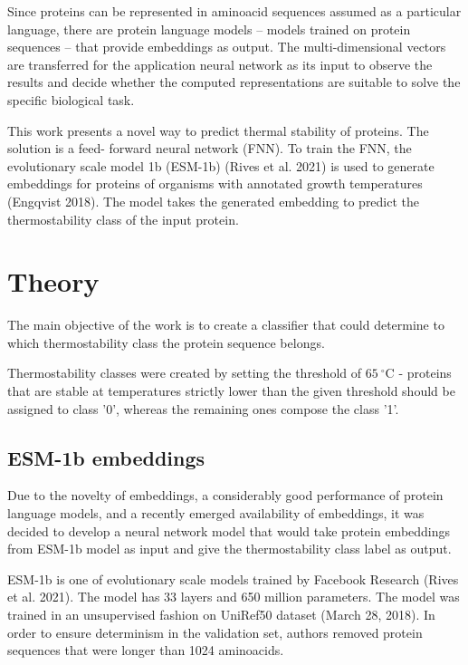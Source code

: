 \documentclass[12pt]{report}
\begin{document}
	Since proteins can be represented in aminoacid sequences assumed as a 
	particular language, there are protein language models – models trained on 
	protein sequences – that provide embeddings as output. The multi-dimensional 
	vectors are transferred for the application neural network as its input to 
	observe the results and decide whether the computed representations are 
	suitable to solve the specific biological task.

	This work presents a novel way to predict thermal stability of proteins. 
	The solution is a feed- forward neural network (FNN). To train the FNN, 
	the evolutionary scale model 1b (ESM-1b) (Rives et al. 2021) is used to 
	generate embeddings for proteins of organisms with annotated growth 
	temperatures (Engqvist 2018). The model 
	takes the generated embedding to predict the thermostability class of the 
	input protein.

	\newpage

	\section{Theory}

	The main objective of the work is to create a classifier that could 
	determine to which thermostability class the protein sequence belongs.

	Thermostability classes were created by setting the threshold of 
	$65\ ^\circ$C - proteins that are stable at temperatures strictly lower 
	than the given threshold should be assigned to class '0', whereas the 
	remaining ones compose the class '1'. 

	\subsection{ESM-1b embeddings}

	Due to the novelty of embeddings, a considerably good performance of
	protein language models, and a recently emerged availability of embeddings,
	it was decided to develop a neural network model that would take protein
	embeddings from ESM-1b model as input and give the thermostability class
	label as output.

	ESM-1b is one of evolutionary scale models trained by Facebook Research 
	(Rives et al. 2021). The model has 33 layers and 650 million parameters. 
	The model was trained in an 
	unsupervised fashion on UniRef50 dataset (March 28, 2018). In order to ensure
	determinism in the validation set, authors removed protein sequences that
	were longer than 1024 aminoacids. 
\end{document}
